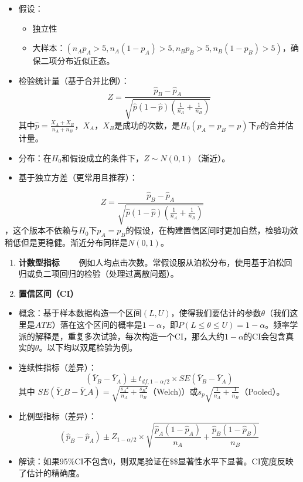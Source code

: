\documentclass[
  letterpaper,
  DIV=11,
  numbers=noendperiod]{scrreprt}
\begin{document}
\begin{itemize}
\item
  假设：

  \begin{itemize}
  \item
    独立性
  \item
    大样本：\((n_A p_A > 5, n_A (1-p_A) > 5, n_B p_B > 5, n_B (1-p_B) > 5)\)，确保二项分布近似正态。
  \end{itemize}
\item
  检验统计量（基于合并比例）：
  \[Z = \frac{\hat{p}_B - \hat{p}_A}{\sqrt{\hat{p}(1-\hat{p}) (\frac{1}{n_A} + \frac{1}{n_B})}}\]
  其中\(\hat{p} = \frac{X_A + X_B}{n_A + n_B}\)，\(X_A\)，\(X_B\)是成功的次数，是\(H_0(p_A =p_B = p)\)下\(p\)的合并估计量。
\item
  分布：在\(H_0\)和假设成立的条件下，\(Z\sim N(0, 1)\)（渐近）。
\item
  基于独立方差（更常用且推荐）：
\end{itemize}

\[Z = \frac{\hat{p}_B - \hat{p}_A}{\sqrt{\hat{p}(1-\hat{p}) (\frac{1}{n_A} + \frac{1}{n_B})}}\]，这个版本不依赖与\(H_0\)下\(p_A=p_B\)的假设，在构建置信区间时更加自然，检验功效稍低但是更稳健。渐近分布同样是\(N(0, 1)\)。

\begin{enumerate}
\def\labelenumi{\arabic{enumi}.}
\setcounter{enumi}{3}
\item
  \textbf{计数型指标}
    例如人均点击次数。常假设服从泊松分布，使用基于泊松回归或负二项回归的检验（处理过离散问题）。
\item
  \textbf{置信区间（CI）}
\end{enumerate}

\begin{itemize}
\item
  概念：基于样本数据构造一个区间\((L, U)\)，使得我们要估计的参数\(\theta\)（我们这里是\(ATE\)）落在这个区间的概率是\(1-\alpha\)，即\(P(L\leq \theta \leq U) = 1-\alpha\)。频率学派的解释是，重复多次试验，每次构造一个CI，那么大约\(1-\alpha\)的CI会包含真实的\(\theta\)。以下均以双尾检验为例。
\item
  连续性指标（差异）：
  \[(\bar{Y}_B - \bar{Y}_A) \pm t_{df, 1-\alpha/2} \times SE(\bar{Y}_B - \bar{Y}_A)\]
  其中
  \(SE(\bar{Y}\_B - \bar{Y}\_A) = \sqrt{\frac{s_A²}{n_A} + \frac{s_B²}{n_B}}\)（Welch)）或\(s_p \sqrt{\frac{1}{n_A} + \frac{1}{n_B}}\)（Pooled）。
\item
  比例型指标（差异）：\[(\hat{p}_B - \hat{p}_A) \pm Z_{1-\alpha/2} \times \sqrt{\frac{\hat{p}_A(1-\hat{p}_A)}{n_A} + \frac{\hat{p}_B(1-\hat{p}_B)}{n_B}}\]
\item
  解读：如果95\%CI不包含0，则双尾验证在\$\alpha \$显著性水平下显著。CI宽度反映了估计的精确度。
\end{itemize}
\end{document}
